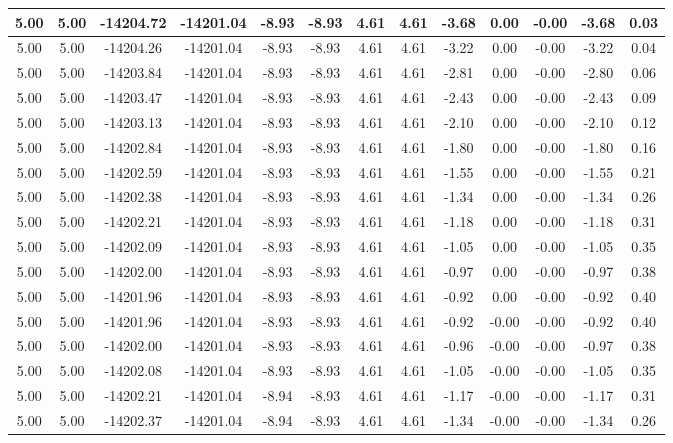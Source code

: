 \begin{table}[htbp]
\begin{adjustbox}{angle=90}
\begin{tabular}{|c|c|c|c|c|c|c|c|c|c|c|c|c|}
 5.00 & 5.00 & -14204.72 & -14201.04 & -8.93 & -8.93 & 4.61 & 4.61 & -3.68 & 0.00 & -0.00 & -3.68 & 0.03\\ \hline
 5.00 & 5.00 & -14204.26 & -14201.04 & -8.93 & -8.93 & 4.61 & 4.61 & -3.22 & 0.00 & -0.00 & -3.22 & 0.04\\ \hline
 5.00 & 5.00 & -14203.84 & -14201.04 & -8.93 & -8.93 & 4.61 & 4.61 & -2.81 & 0.00 & -0.00 & -2.80 & 0.06\\ \hline
 5.00 & 5.00 & -14203.47 & -14201.04 & -8.93 & -8.93 & 4.61 & 4.61 & -2.43 & 0.00 & -0.00 & -2.43 & 0.09\\ \hline
 5.00 & 5.00 & -14203.13 & -14201.04 & -8.93 & -8.93 & 4.61 & 4.61 & -2.10 & 0.00 & -0.00 & -2.10 & 0.12\\ \hline
 5.00 & 5.00 & -14202.84 & -14201.04 & -8.93 & -8.93 & 4.61 & 4.61 & -1.80 & 0.00 & -0.00 & -1.80 & 0.16\\ \hline
 5.00 & 5.00 & -14202.59 & -14201.04 & -8.93 & -8.93 & 4.61 & 4.61 & -1.55 & 0.00 & -0.00 & -1.55 & 0.21\\ \hline
 5.00 & 5.00 & -14202.38 & -14201.04 & -8.93 & -8.93 & 4.61 & 4.61 & -1.34 & 0.00 & -0.00 & -1.34 & 0.26\\ \hline
 5.00 & 5.00 & -14202.21 & -14201.04 & -8.93 & -8.93 & 4.61 & 4.61 & -1.18 & 0.00 & -0.00 & -1.18 & 0.31\\ \hline
 5.00 & 5.00 & -14202.09 & -14201.04 & -8.93 & -8.93 & 4.61 & 4.61 & -1.05 & 0.00 & -0.00 & -1.05 & 0.35\\ \hline
 5.00 & 5.00 & -14202.00 & -14201.04 & -8.93 & -8.93 & 4.61 & 4.61 & -0.97 & 0.00 & -0.00 & -0.97 & 0.38\\ \hline
 5.00 & 5.00 & -14201.96 & -14201.04 & -8.93 & -8.93 & 4.61 & 4.61 & -0.92 & 0.00 & -0.00 & -0.92 & 0.40\\ \hline
 5.00 & 5.00 & -14201.96 & -14201.04 & -8.93 & -8.93 & 4.61 & 4.61 & -0.92 & -0.00 & -0.00 & -0.92 & 0.40\\ \hline
 5.00 & 5.00 & -14202.00 & -14201.04 & -8.93 & -8.93 & 4.61 & 4.61 & -0.96 & -0.00 & -0.00 & -0.97 & 0.38\\ \hline
 5.00 & 5.00 & -14202.08 & -14201.04 & -8.93 & -8.93 & 4.61 & 4.61 & -1.05 & -0.00 & -0.00 & -1.05 & 0.35\\ \hline
 5.00 & 5.00 & -14202.21 & -14201.04 & -8.94 & -8.93 & 4.61 & 4.61 & -1.17 & -0.00 & -0.00 & -1.17 & 0.31\\ \hline
 5.00 & 5.00 & -14202.37 & -14201.04 & -8.94 & -8.93 & 4.61 & 4.61 & -1.34 & -0.00 & -0.00 & -1.34 & 0.26\\ \hline

\end{tabular}
\end{adjustbox}
\end{table}
